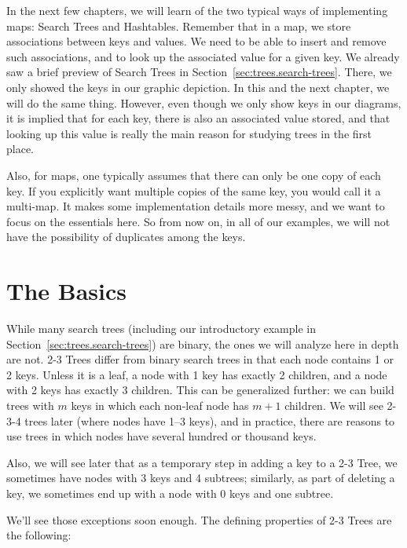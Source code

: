 \newcommand{\ProblemTree}{%
\pstree{\Tcircle[fillstyle=solid,fillcolor=black]{\phantom{5}}}
	{
   	   \Ttri{$T$}
	}
}

In the next few chapters, we will learn of the two typical ways of
implementing maps: Search Trees and Hashtables.
Remember that in a map, we store associations between keys and values.
We need to be able to insert and remove such associations, and to look
up the associated value for a given key.
We already saw a brief preview of Search Trees in Section~\ref{sec:trees.search-trees}.
There, we only showed the keys in our graphic depiction.
In this and the next chapter, we will do the same thing. 
However, even though we only show keys in our diagrams, it is implied
that for each key, there is also an associated value stored, and that
looking up this value is really the main reason for studying trees in
the first place.

Also, for maps, one typically assumes that there can only be one copy
of each key. If you explicitly want multiple copies of the same key,
you would call it a multi-map. It makes some implementation details
more messy, and we want to focus on the essentials here. So from now
on, in all of our examples, we will not have the possibility of
duplicates among the keys.

\section{The Basics}
While many search trees (including our introductory example in
Section~\ref{sec:trees.search-trees})
are binary, the ones we will analyze here in depth are not.
2-3 Trees differ from binary search trees in that each node contains 1
or 2 keys.
Unless it is a leaf, a node with 1 key has exactly 2 children, and a
node with 2 keys has exactly 3 children.
This can be generalized further: we can build trees with $m$ keys in
which each non-leaf node has $m+1$ children. We will see 2-3-4 trees
later (where nodes have 1--3 keys), and in practice, there are reasons
to use trees in which nodes have several hundred or thousand keys.

Also, we will see later that as a temporary step in adding a key to a
2-3 Tree, we sometimes have nodes with 3 keys and 4 subtrees;
similarly, as part of deleting a key, we sometimes end up with a node
with 0 keys and one subtree. 

We'll see those exceptions soon enough.
The defining properties of 2-3 Trees are the following:

